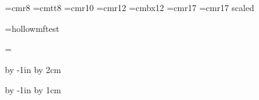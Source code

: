 
\hsize=297mm
\vsize=420mm






\font\small=cmr8
\font\smalltt=cmtt8
\font\medium=cmr10
\font\large=cmr12
\font\largebx=cmbx12
\font\Large=cmr17
\font\huge=cmr17 scaled 

\font\hollow=hollowmftest


\headline={\hfil}

\advance\voffset by -1in
\advance\voffset by 2cm

\advance\hoffset by -1in
\advance\hoffset by 1cm

\parindent=0pt
\parskip=0pt

\def\epsfsize#1#2{#1}

\nopagenumbers


\vbox{}
\vskip4cm
\vfil\eject





\bye



\bye



